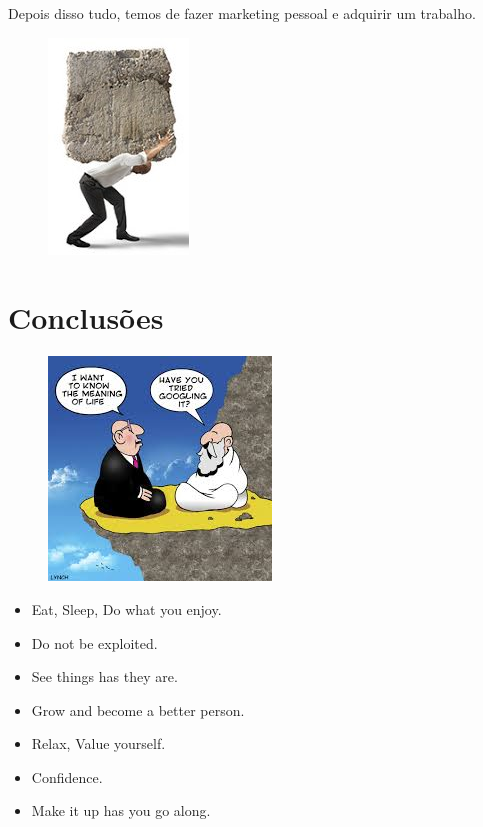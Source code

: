 \begin{frame}
Depois disso tudo, temos de fazer marketing pessoal e adquirir um trabalho. \vfill
\begin{minipage}{5cm}
	\begin{figure}[ht]
		\flushleft
		\includegraphics[scale=0.6]{./image/Job/Burden.jpg}
	\end{figure}
\end{minipage}
\end{frame}
\section{Conclusões}
\begin{frame}
\begin{minipage}{7cm}
	\begin{figure}[ht]
		\flushleft
		\includegraphics[scale=0.7]{./image/Objectives/Meaning_of_Life.jpeg}
	\end{figure}
\end{minipage}
\begin{minipage}{5cm}
	\begin{itemize}
		\item Eat, Sleep, Do what you enjoy.
		\item Do not be exploited.
		\item See things has they are.
		\item Grow and become a better person.
		\item Relax, Value yourself.
		\item Confidence.
		\item Make it up has you go along.
	\end{itemize}
\end{minipage}
\end{frame}

